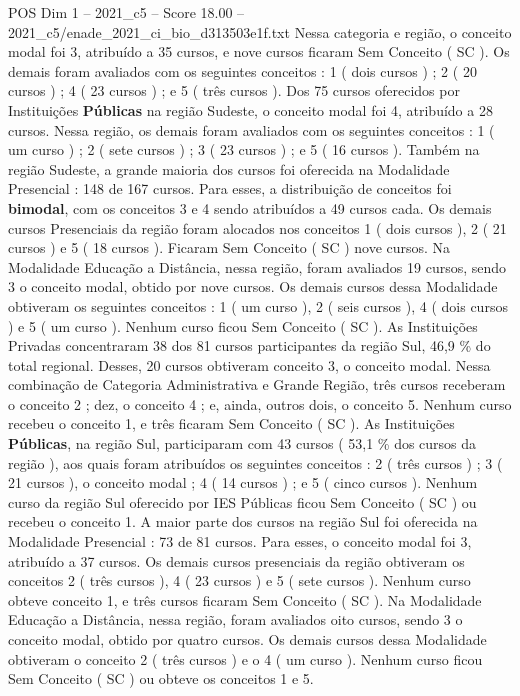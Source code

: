 \begin{textsample}{POS Dim 1 – 2021\_c5 – Score 18.00 – 2021\_c5/enade\_2021\_ci\_bio\_d313503e1f.txt}
Nessa categoria e região, o conceito modal foi 3, atribuído a 35 cursos, e nove cursos ficaram Sem Conceito ( SC ).
Os demais foram avaliados com os seguintes conceitos : 1 ( dois cursos ) ; 2 ( 20 cursos ) ; 4 ( 23 cursos ) ; e 5 ( três cursos ).
Dos 75 cursos oferecidos por Instituições \textbf{Públicas} na região Sudeste, o conceito modal foi 4, atribuído a 28 cursos.
Nessa região, os demais foram avaliados com os seguintes conceitos : 1 ( um curso ) ; 2 ( sete cursos ) ; 3 ( 23 cursos ) ; e 5 ( 16 cursos ).
Também na região Sudeste, a grande maioria dos cursos foi oferecida na Modalidade Presencial : 148 de 167 cursos.
Para esses, a distribuição de conceitos foi \textbf{bimodal}, com os conceitos 3 e 4 sendo atribuídos a 49 cursos cada.
Os demais cursos Presenciais da região foram alocados nos conceitos 1 ( dois cursos ), 2 ( 21 cursos ) e 5 ( 18 cursos ).
Ficaram Sem Conceito ( SC ) nove cursos.
Na Modalidade Educação a Distância, nessa região, foram avaliados 19 cursos, sendo 3 o conceito modal, obtido por nove cursos.
Os demais cursos dessa Modalidade obtiveram os seguintes conceitos : 1 ( um curso ), 2 ( seis cursos ), 4 ( dois cursos ) e 5 ( um curso ).
Nenhum curso ficou Sem Conceito ( SC ).
As Instituições Privadas concentraram 38 dos 81 cursos participantes da região Sul, 46,9 \% do total regional.
Desses, 20 cursos obtiveram conceito 3, o conceito modal.
Nessa combinação de Categoria Administrativa e Grande Região, três cursos receberam o conceito 2 ; dez, o conceito 4 ; e, ainda, outros dois, o conceito 5.
Nenhum curso recebeu o conceito 1, e três ficaram Sem Conceito ( SC ).
As Instituições \textbf{Públicas}, na região Sul, participaram com 43 cursos ( 53,1 \% dos cursos da região ), aos quais foram atribuídos os seguintes conceitos : 2 ( três cursos ) ; 3 ( 21 cursos ), o conceito modal ; 4 ( 14 cursos ) ; e 5 ( cinco cursos ).
Nenhum curso da região Sul oferecido por IES Públicas ficou Sem Conceito ( SC ) ou recebeu o conceito 1.
A maior parte dos cursos na região Sul foi oferecida na Modalidade Presencial : 73 de 81 cursos.
Para esses, o conceito modal foi 3, atribuído a 37 cursos.
Os demais cursos presenciais da região obtiveram os conceitos 2 ( três cursos ), 4 ( 23 cursos ) e 5 ( sete cursos ).
Nenhum curso obteve conceito 1, e três cursos ficaram Sem Conceito ( SC ).
Na Modalidade Educação a Distância, nessa região, foram avaliados oito cursos, sendo 3 o conceito modal, obtido por quatro cursos.
Os demais cursos dessa Modalidade obtiveram o conceito 2 ( três cursos ) e o 4 ( um curso ).
Nenhum curso ficou Sem Conceito ( SC ) ou obteve os conceitos 1 e 5.

\end{textsample}
